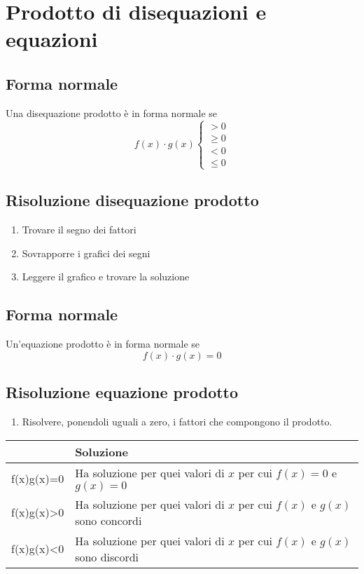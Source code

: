 \chapter{Prodotto di disequazioni e equazioni}
\section{Forma normale}
Una disequazione prodotto è in forma normale se
\begin{equation}
f(x)\cdot g(x)\begin{cases}
>0\\
\geq 0\\
<0\\
\leq 0
\end{cases}
\end{equation}
\section{Risoluzione disequazione prodotto}
\begin{enumerate}
	\item Trovare il segno dei fattori
	\item Sovrapporre i grafici dei segni
	\item Leggere il grafico e trovare la soluzione
\end{enumerate}
\section{Forma normale}
Un'equazione prodotto è in forma normale se
\begin{equation}
f(x)\cdot g(x)=0
\end{equation}
\section{Risoluzione equazione prodotto}
\begin{enumerate}
	\item Risolvere, ponendoli uguali a zero, i fattori che compongono il prodotto.
\end{enumerate}
\begin{center}
	\begin{tabular}{Cp{0.4\textwidth}}
		\toprule
		& Soluzione \\ 
		\midrule
		f(x)\cdot g(x)=0	& Ha soluzione per quei valori di $x$ per cui $f(x)=0$ e $g(x)= 0$  \\ 
		f(x)\cdot g(x)>0	& Ha soluzione per quei valori di $x$ per cui $f(x)$ e $g(x)$ sono concordi\\ 
	f(x)\cdot g(x)<0& Ha soluzione per quei valori di $x$ per cui $f(x)$ e $g(x)$ sono discordi\\ 
		\bottomrule
	\end{tabular}
\end{center}